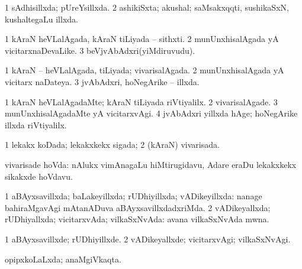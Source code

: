 {\bentry
{} 
\gl{\gu}
\expl{}
\bmng
\bnum
\num{1} sAdhisillxda; pUreYsillxda. 
\num{2} ashikiSxta; akushal; saMsakxqqti, sushikaSxN, kushaltegaLu illxda. 
\enum
\emng
\eentry

\bentry
{} 
\gl{\nA}
\expl{}
\bmng
\bnum
\num{1} kAraN heVLalAgada, kAraN tiLiyada -- sithxti. 
\num{2} munUnxhisalAgada yA vicitarxnaDevaLike. 
\num{3} beVjvAbAdxri(yiMdiruvudu). 
\enum
\emng
\eentry

\bentry
{} 
\gl{\gu}
\expl{}
\bmng
\bnum
\num{1} kAraN -- heVLalAgada, tiLiyada; vivarisalAgada. 
\num{2} munUnxhisalAgada yA vicitarx naDateya. 
\num{3} jvAbAdxri, hoNegArike -- illxda. 
\enum
\emng
\eentry

\bentry
{} 
\bmng
{} 
\emng
\eentry

\bentry
{} 
\gl{\kirxvi}
\expl{}
\bmng
\bnum
\num{1} kAraN heVLalAgadaMte; kAraN tiLiyada riVtiyalilx. 
\num{2} vivarisalAgade. 
\num{3} munUnxhisalAgadaMte yA vicitarxvAgi. 
\num{4} jvAbAdxri yillxda hAge; hoNegArike illxda riVtiyalilx. 
\enum
\emng
\eentry

\bentry
{} 
\gl{\gu}
\expl{}
\bmng
\bnum
\num{1} lekakx koDada; lekakxkekx sigada; 
\num{2} (kAraN) vivarisada. 
\enum
\emng

\noindent
\gl{\pagu}
\expl{}
\bmng
{} vivarisade hoVda:  nAlukx vimAnagaLu hiMtirugidavu, Adare eraDu lekakxkekx sikakxde hoVdavu. 
\emng
\eentry

\bentry
{} 
\gl{\gu}
\expl{}
\bmng
\bnum
\num{1} aBAyxsavillxda; baLakeyillxda; rUDhiyillxda; vADikeyillxda:  nanage bahiraMgavAgi mAtanADuva aBAyxsavillxdadxriMda. 
\num{2} vADikeyallxda; rUDhiyallxda; vicitarxvAda; vilkaSxNvAda:  avana vilkaSxNvAda mwna. 
\enum
\emng
\eentry

\bentry
{} 
\gl{\kirxvi}
\expl{}
\bmng
\bnum
\num{1} aBAyxsavillxde; rUDhiyillxde. 
\num{2} vADikeyallxde; vicitarxvAgi; vilkaSxNvAgi. 
\enum
\emng
\eentry

\bentry
{} 
\gl{\gu}
\expl{}
\bmng
opipxkoLaLxda; anaMgiVkaqta. 
\emng
\eentry

}
